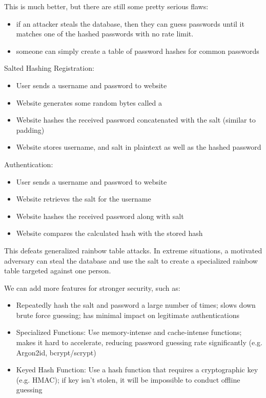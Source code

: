 \documentclass[code]{amznotes}
\begin{document}
This is much better, but there are still some pretty serious flaws:
\begin{itemize}[noitemsep]
    \item {} if an attacker steals the database, then they can guess passwords until it matches one of the hashed passwords with no rate limit.
    \item {} someone can simply create a table of password hashes for common passwords
\end{itemize}

\begin{exbox}{Salted Hashing}{}
    Registration:
    \begin{itemize}[noitemsep]
        \item User sends a username and password to website
        \item Website generates some random bytes called a 
        \item Website hashes the received password concatenated with the salt (similar to padding)
        \item Website stores username, and salt in plaintext as well as the hashed password
    \end{itemize}
    Authentication:
    \begin{itemize}[noitemsep]
        \item User sends a username and password to website
        \item Website retrieves the salt for the username
        \item Website hashes the received password along with salt
        \item Website compares the calculated hash with the stored hash
    \end{itemize}
\end{exbox}

This defeats generalized rainbow table attacks. In extreme situations, a motivated adversary can steal the database and use the salt to create a specialized rainbow table targeted against one person.

We can add more features for stronger security, such as:
\begin{itemize}[noitemsep]
    \item {} Repeatedly hash the salt and password a large number of times; slows down brute force guessing; has minimal impact on legitimate authentications
    \item Specialized Functions: Use memory-intense and cache-intense functions; makes it hard to accelerate, reducing password guessing rate significantly (e.g. Argon2id, bcrypt/scrypt)
    \item Keyed Hash Function: Use a hash function that requires a cryptographic key (e.g. HMAC); if key isn't stolen, it will be impossible to conduct offline guessing
\end{itemize}
\end{document}
